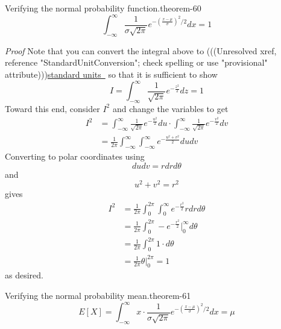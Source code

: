 \documentclass[10pt,]{book}
\makeatletter
\renewcommand*{\proofname}{Proof}
\renewenvironment{proof}[1][\proofname]{\par
  \pushQED{\qed}%
  \normalfont \topsep6\p@\@plus6\p@\relax
  \trivlist
  \item\relax
    {\itshape
    #1\@addpunct{.}}\hspace\labelsep\ignorespaces
}{%
  \popQED\endtrivlist\@endpefalse
}
\numberwithin{equation}{section}
\makeatother
\begin{document}
%
\par
\hypertarget{p-1027}{}%
\begin{theorem}{Verifying the normal probability function.}{}{theorem-60}%
\hypertarget{p-1028}{}%
%
\begin{equation*}
\int_{-\infty}^{\infty} \frac{1}{\sigma \sqrt{2 \pi}} e^{ -\left ( \frac{x-\mu}{\sigma} \right ) ^2 / 2} dx = 1
\end{equation*}
%
\end{theorem}
\begin{proof}\hypertarget{proof-62}{}
\hypertarget{p-1029}{}%
Note that you can convert the integral above to {(((Unresolved xref, reference "StandardUnitConversion"; check spelling or use "provisional" attribute)))}\hyperlink{}{standard units~} so that it is sufficient to show%
\begin{equation*}
I = \int_{-\infty}^{\infty} \frac{1}{\sqrt{2 \pi}} e^{ -\frac{z^2}{2} } dz = 1
\end{equation*}
Toward this end, consider \(I^2\) and change the variables to get%
\begin{align*}
I^2 & = \int_{-\infty}^{\infty} \frac{1}{\sqrt{2 \pi}} e^{ -\frac{u^2}{2} } du \cdot \int_{-\infty}^{\infty} \frac{1}{\sqrt{2 \pi}} e^{ -\frac{v^2}{2} } dv\\
& = \frac{1}{2 \pi} \int_{-\infty}^{\infty} \int_{-\infty}^{\infty} e^{ -\frac{u^2+v^2}{2} } du dv
\end{align*}
Converting to polar coordinates using%
\begin{equation*}
du dv = r dr d\theta 
\end{equation*}
and%
\begin{equation*}
u^2 + v^2 = r^2
\end{equation*}
gives%
\begin{align*}
I^2 & = \frac{1}{2 \pi} \int_0^{2 \pi} \int_0^{\infty} e^{ -\frac{r^2}{2} } r dr d\theta\\
& = \frac{1}{2 \pi} \int_0^{2 \pi} -e^{ -\frac{r^2}{2} } \big |_0^{\infty} d\theta\\
& = \frac{1}{2 \pi} \int_0^{2 \pi} 1 \cdot d\theta\\
& = \frac{1}{2 \pi} \theta \big |_0^{2 \pi} = 1
\end{align*}
as desired.%
\end{proof}
%
\par
\hypertarget{p-1030}{}%
\begin{theorem}{Verifying the normal probability mean.}{}{theorem-61}%
\hypertarget{p-1031}{}%
%
\begin{equation*}
E[X] = \int_{-\infty}^{\infty} x \cdot \frac{1}{\sigma \sqrt{2 \pi}} e^{ - \left ( \frac{x-\mu}{\sigma} \right ) ^2 / 2} dx = \mu
\end{equation*}
%
\end{theorem}
\end{document}
